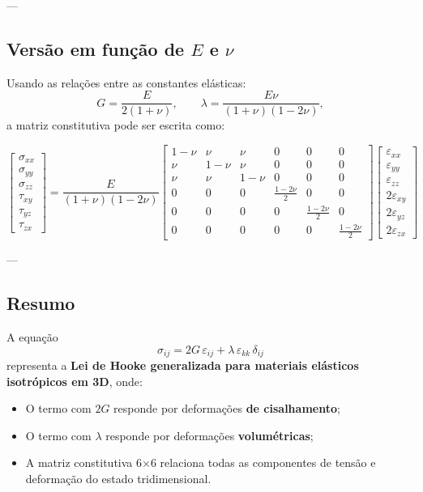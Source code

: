 ---

\subsection*{Versão em função de $E$ e $\nu$}

Usando as relações entre as constantes elásticas:
\[
G = \frac{E}{2(1+\nu)}, 
\qquad
\lambda = \frac{E\nu}{(1+\nu)(1-2\nu)},
\]
a matriz constitutiva pode ser escrita como:

\[
\begin{bmatrix}
\sigma_{xx} \\[4pt]
\sigma_{yy} \\[4pt]
\sigma_{zz} \\[4pt]
\tau_{xy} \\[4pt]
\tau_{yz} \\[4pt]
\tau_{zx}
\end{bmatrix}
=
\frac{E}{(1+\nu)(1-2\nu)}
\begin{bmatrix}
1-\nu & \nu & \nu & 0 & 0 & 0 \\[4pt]
\nu & 1-\nu & \nu & 0 & 0 & 0 \\[4pt]
\nu & \nu & 1-\nu & 0 & 0 & 0 \\[4pt]
0 & 0 & 0 & \tfrac{1-2\nu}{2} & 0 & 0 \\[4pt]
0 & 0 & 0 & 0 & \tfrac{1-2\nu}{2} & 0 \\[4pt]
0 & 0 & 0 & 0 & 0 & \tfrac{1-2\nu}{2}
\end{bmatrix}
\begin{bmatrix}
\varepsilon_{xx} \\[4pt]
\varepsilon_{yy} \\[4pt]
\varepsilon_{zz} \\[4pt]
2\varepsilon_{xy} \\[4pt]
2\varepsilon_{yz} \\[4pt]
2\varepsilon_{zx}
\end{bmatrix}
\]

---

\subsection*{Resumo}

A equação
\[
\sigma_{ij} = 2G\,\varepsilon_{ij} + \lambda\,\varepsilon_{kk}\,\delta_{ij}
\]
representa a \textbf{Lei de Hooke generalizada para materiais elásticos isotrópicos em 3D},  
onde:
\begin{itemize}
    \item O termo com $2G$ responde por deformações \textbf{de cisalhamento};
    \item O termo com $\lambda$ responde por deformações \textbf{volumétricas};
    \item A matriz constitutiva 6×6 relaciona todas as componentes de tensão e deformação do estado tridimensional.
\end{itemize}


